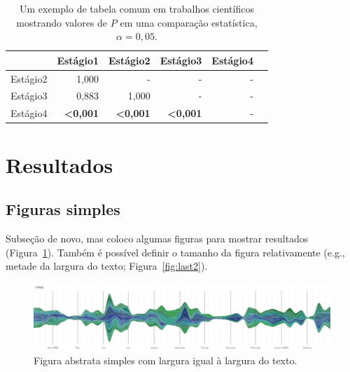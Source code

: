 \begin{table}[htbp]
    \caption[Tabelas com valores de $P$]{Um exemplo de tabela comum em trabalhos científicos mostrando valores de $P$ em uma comparação estatística, $\alpha=0,05$.}
    \label{tab:areap}
    \vspace{1em}
    \centering
    \begin{tabular}{l r r r r r}
        \toprule
        ~	        & Estágio1          & Estágio2      & Estágio3	        & Estágio4\\
        \midrule
        Estágio2	& 1,000		    & -		    & -		        & -\\
        Estágio3	& 0,883		    & 1,000	    & -		        & -\\
        Estágio4	& \textbf{<0,001}   &\textbf{<0,001}& \textbf{<0,001}   & -\\
        \bottomrule
    \end{tabular}
\end{table}

\section{Resultados}\label{cap2:res}

\subsection{Figuras simples}\label{cap2:res:figs}

Subseção de novo, mas coloco algumas figuras para mostrar resultados (Figura~\ref{fig:last}).
Também é possível definir o tamanho da figura relativamente (e.g., metade da largura do texto; Figura~\ref{fig:last2}).

\begin{figure}[htbp]
    \centering
    \includegraphics[width=\textwidth]{lastgraph}
    \caption[Figura simples]{Figura abstrata simples com largura igual à largura do texto.}
    \label{fig:last}
\end{figure}

